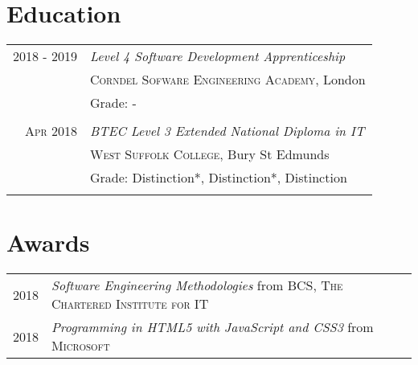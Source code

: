 \documentclass[a4paper,10pt]{article}
\begin{document}
\section{Education}
\begin{tabular}{r|p{11cm}}
    \textsc{2018 - 2019} & \textit{Level 4 Software Development Apprenticeship}\\
    &\textsc{Corndel Sofware Engineering Academy}, London\\
    &\footnotesize{Grade: -}\\
    \multicolumn{2}{c}{} \\
    
    \textsc{Apr 2018} & \textit{BTEC Level 3 Extended National Diploma in IT}\\
    &\textsc{West Suffolk College}, Bury St Edmunds\\
    &\footnotesize{Grade: Distinction*, Distinction*, Distinction}\\
    \multicolumn{2}{c}{} \\
\end{tabular}

\section{Awards}
\begin{tabular}{rl}
    \textsc{2018} & \textit{Software Engineering Methodologies} from \textsc{BCS, The Chartered Institute for IT}\\
    \textsc{2018} & \textit{Programming in HTML5 with JavaScript and CSS3} from \textsc{Microsoft}\\
\end{tabular}
\end{document}
